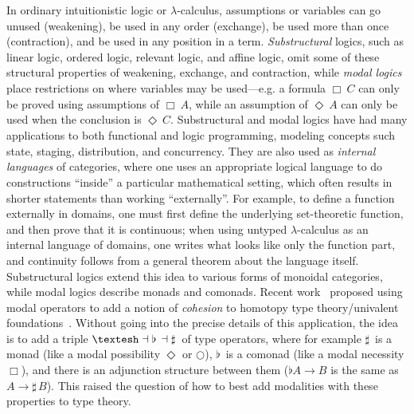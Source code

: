 \documentclass[a4paper,USenglish,numberwithinsect]{lipics-v2016}
\newcommand\Bx[2]{\ensuremath{\Box_{#1} \, {#2}}}
\newcommand\Dia[2]{\ensuremath{\Diamond_{#1} \, {#2}}}
\newcommand\Flat[1]{\ensuremath{\flat \, {#1}}}
\newcommand\Sharp[1]{\ensuremath{\sharp \, {#1}}}
\newcommand{\sh}{\text{\textesh}}
\newcommand\la\dashv
\begin{document}
In ordinary intuitionistic logic or $\lambda$-calculus, assumptions or
variables can go unused (weakening), be used in any order (exchange), be
used more than once (contraction), and be used in any position in a
term.  \emph{Substructural} logics, such as linear logic, ordered logic,
relevant logic, and affine logic, omit some of these structural
properties of weakening, exchange, and contraction, while \emph{modal
  logics} place restrictions on where variables may be used---e.g. a
formula $\Bx{} C$ can only be proved using assumptions of $\Bx{} A$,
while an assumption of $\Dia{}{A}$ can only be used when the conclusion
is $\Dia{}{C}$.  Substructural and modal logics have had many
applications to both functional and logic programming, modeling concepts
such state, staging, distribution, and concurrency.  They are also used
as \emph{internal languages} of categories, where one uses an
appropriate logical language to do constructions ``inside'' a particular
mathematical setting, which often results in shorter statements than
working ``externally''.  For example, to define a function externally in
domains, one must first define the underlying set-theoretic function,
and then prove that it is continuous; when using untyped
$\lambda$-calculus as an internal language of domains, one writes what
looks like only the function part, and continuity follows from a general
theorem about the language itself.  Substructural logics extend this
idea to various forms of monoidal categories, while modal logics
describe monads and comonads.  Recent
work~\cite{schreibershulman12cohesive,shulman15realcohesion} proposed
using modal operators to add a notion of \emph{cohesion} to homotopy
type theory/univalent
foundations~\cite{voevodsky06homotopy,uf13hott-book}.  Without going
into the precise details of this application, the idea is to add a
triple $\sh{} \la \Flat{} \la \Sharp{}$ of type operators, where for
example $\Sharp{}$ is a monad (like a modal possibility $\Diamond$ or
$\bigcirc$), $\Flat{}$ is a comonad (like a modal necessity $\Box$), and
there is an adjunction structure between them ($\flat{A} \to B$ is the
same as $A \to \Sharp{B}$).  This raised the question of how to best add
modalities with these properties to type theory.
\end{document}
